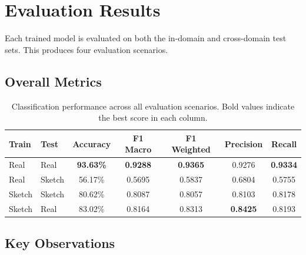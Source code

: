 \documentclass[12pt, a4paper]{article}
\begin{document}
\section{Evaluation Results}
\label{sec:evaluation}

Each trained model is evaluated on both the in-domain and cross-domain test
sets.  This produces four evaluation scenarios.

\subsection{Overall Metrics}

\begin{table}[H]
\centering
\caption{Classification performance across all evaluation scenarios.  Bold
values indicate the best score in each column.}
\label{tab:eval_metrics}
\begin{tabular}{llccccc}
\toprule
\textbf{Train} & \textbf{Test} & \textbf{Accuracy} & \textbf{F1 Macro}
& \textbf{F1 Weighted} & \textbf{Precision} & \textbf{Recall} \\
\midrule
Real   & Real   & \textbf{93.63\%} & \textbf{0.9288} & \textbf{0.9365}
       & 0.9276 & \textbf{0.9334} \\
Real   & Sketch & 56.17\%          & 0.5695          & 0.5837
       & 0.6804 & 0.5755 \\
Sketch & Sketch & 80.62\%          & 0.8087          & 0.8057
       & 0.8103 & 0.8178 \\
Sketch & Real   & 83.02\%          & 0.8164          & 0.8313
       & \textbf{0.8425} & 0.8193 \\
\bottomrule
\end{tabular}
\end{table}

\subsection{Key Observations}
\end{document}
